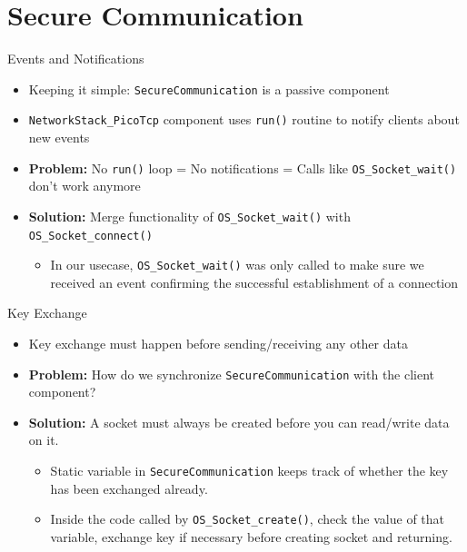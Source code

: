 \section{Secure Communication}

\begin{frame}{Events and Notifications}
\begin{itemize}
\item Keeping it simple: \texttt{SecureCommunication} is a passive component
\item \texttt{NetworkStack\_PicoTcp} component uses \texttt{run()} routine to notify clients about new events
\item \textbf{Problem:}  No \texttt{run()} loop = No notifications = Calls like \texttt{OS\_Socket\_wait()} don't work anymore
\item \textbf{Solution:} Merge functionality of \texttt{OS\_Socket\_wait()} with \texttt{OS\_Socket\_connect()}
    \begin{itemize}
    \item In our usecase, \texttt{OS\_Socket\_wait()} was only called to make sure we received an event confirming the successful establishment of a connection
    \end{itemize}
\end{itemize}
\end{frame}

\begin{frame}{Key Exchange}
\begin{itemize}
\item Key exchange must happen before sending/receiving any other data
\item \textbf{Problem:} How do we synchronize \texttt{SecureCommunication} with the client component?
\item \textbf{Solution:} A socket must always be created before you can read/write data on it.
    \begin{itemize}
    \item Static variable in \texttt{SecureCommunication} keeps track of whether the key has been exchanged already.
    \item Inside the code called by \texttt{OS\_Socket\_create()}, check the value of that variable, exchange key if necessary before creating socket and returning.
    \end{itemize}
\end{itemize}
\end{frame}

